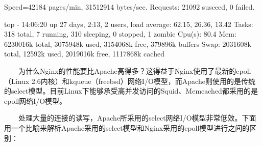 Speed=42184 pages/min, 31512914 bytes/sec.
Requests: 21092 susceed, 0 failed.

top - 14:06:20 up 27 days,  2:13,  2 users,  load average: 62.15, 26.36, 13.42
Tasks: 318 total,   7 running, 310 sleeping,   0 stopped,   1 zombie
Cpu(s): 80.4%
Mem:   6230016k total,  3075948k used,  3154068k free,   379896k buffers
Swap:  2031608k total,    12592k used,  2019016k free,  1117868k cached



　　为什么Nginx的性能要比Apache高得多？这得益于Nginx使用了最新的epoll（Linux 2.6内核）和kqueue（freebsd）网络I/O模型，而Apache则使用的是传统的select模型。目前Linux下能够承受高并发访问的Squid、Memcached都采用的是epoll网络I/O模型。

　　处理大量的连接的读写，Apache所采用的select网络I/O模型非常低效。下面用一个比喻来解析Apache采用的select模型和Nginx采用的epoll模型进行之间的区别：
